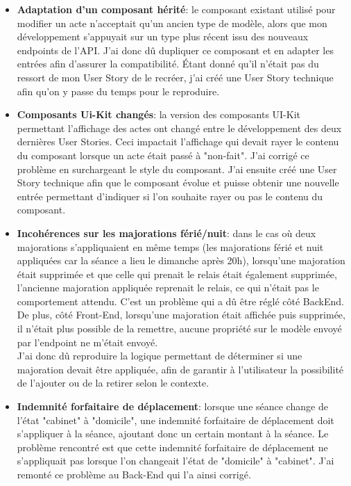 \documentclass{article}
\begin{document}
\begin{itemize}
    \item \textbf{Adaptation d'un composant hérité}: le composant existant utilisé pour modifier un acte n'acceptait qu'un ancien type de modèle, alors que mon développement s'appuyait sur un type plus récent issu des nouveaux endpoints de l'API. J'ai donc dû dupliquer ce composant et en adapter les entrées afin d'assurer la compatibilité. Étant donné qu'il n'était pas du ressort de mon User Story de le recréer, j'ai créé une User Story technique afin qu'on y passe du temps pour le reproduire.

    \item \textbf{Composants Ui-Kit changés}: la version des composants UI-Kit permettant l'affichage des actes ont changé entre le développement des deux dernières User Stories. Ceci impactait l'affichage qui devait rayer le contenu du composant lorsque un acte était passé à "non-fait". J'ai corrigé ce problème en surchargeant le style du composant. J'ai ensuite créé une User Story technique afin que le composant évolue et puisse obtenir une nouvelle entrée permettant d'indiquer si l'on souhaite rayer ou pas le contenu du composant.

    \item \textbf{Incohérences sur les majorations férié/nuit}: dans le cas où deux majorations s'appliquaient en même temps (les majorations férié et nuit appliquées car la séance a lieu le dimanche après 20h), lorsqu'une majoration était supprimée et que celle qui prenait le relais était également supprimée, l'ancienne majoration appliquée reprenait le relais, ce qui n'était pas le comportement attendu. C'est un problème qui a dû être réglé côté BackEnd. De plus, côté Front-End, lorsqu'une majoration était affichée puis supprimée, il n'était plus possible de la remettre, aucune propriété sur le modèle envoyé par l'endpoint ne m'était envoyé. \\ 
    J'ai donc dû reproduire la logique permettant de déterminer si une majoration devait être appliquée, afin de garantir à l'utilisateur la possibilité de l'ajouter ou de la retirer selon le contexte.

    \item \textbf{Indemnité forfaitaire de déplacement}: lorsque une séance change de l'état "cabinet" à "domicile", une indemnité forfaitaire de déplacement doit s'appliquer à la séance, ajoutant donc un certain montant à la séance. Le problème rencontré est que cette indemnité forfaitaire de déplacement ne s'appliquait pas lorsque l'on changeait l'état de "domicile" à "cabinet". J'ai remonté ce problème au Back-End qui l'a ainsi corrigé.


\end{itemize}
\end{document}
